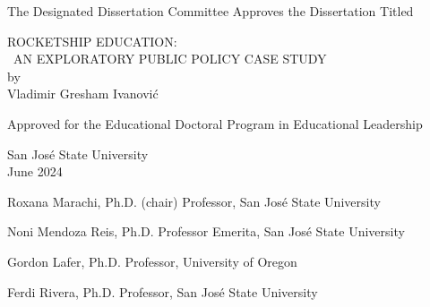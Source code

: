
\begin{vplace}%
\OnehalfSpacing%
\begin{center}
The Designated Dissertation Committee Approves the Dissertation Titled\\
\vspace{2\baselineskip}

ROCKETSHIP EDUCATION:\\\vspace{1ex}
~AN EXPLORATORY PUBLIC POLICY CASE STUDY\\
by\\
Vladimir Gresham Ivanović\\
\vspace{2\baselineskip}

Approved for the Educational Doctoral Program in Educational Leadership\\
\vspace{2\baselineskip}

San José State University\\
\vspace{2\baselineskip}
June 2024\\
\vspace{4\baselineskip}
\end{center}



Roxana Marachi, Ph.D. (chair)\hfill{} Professor, San José State University\\
\vspace{\baselineskip}

Noni Mendoza Reis, Ph.D.\hfill{} Professor Emerita, San José State University\\
\vspace{\baselineskip}

Gordon Lafer, Ph.D.\hfill{} Professor, University of Oregon
\vspace{\baselineskip}

Ferdi Rivera, Ph.D.\hfill{} Professor, San José State University

\end{vplace}

\thispagestyle{empty}

